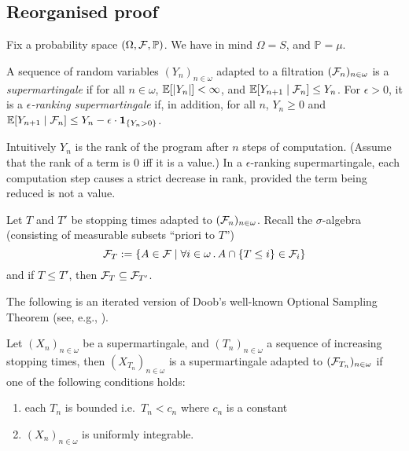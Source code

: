 \subsection*{Reorganised proof}

Fix a probability space $(\Omega, \mathcal{F}, \mathbb{P})$. 
We have in mind $\Omega = S$, and $\mathbb{P} = \mu$.

\begin{definition}\rm
A sequence of random variables $(Y_n)_{n \in \omega}$ adapted to a filtration $(\mathcal{F}_n)_{n \in \omega}$ is a \emph{supermartingale} if for all $n \in \omega$, $\mathbb{E}[|Y_n|] < \infty$, and $\mathbb{E}[Y_{n+1} \mid \mathcal{F}_n] \leq Y_n$.
For $\epsilon > 0$, it is a \emph{$\epsilon$-ranking supermartingale} if, in addition, for all $n$, $Y_n \geq 0$ and $\mathbb{E}[Y_{n+1} \mid \mathcal{F}_n] \leq Y_n - \epsilon \cdot \mathbf{1}_{\{Y_n > 0\}}$.
\citep{DBLP:conf/popl/FioritiH15,DBLP:conf/popl/ChatterjeeFNH16}
\end{definition}

Intuitively $Y_n$ is the rank of the program after $n$ steps of computation.
(Assume that the rank of a term is 0 iff it is a value.) In a $\epsilon$-ranking supermartingale, each computation step causes a strict decrease in rank, provided the term being reduced is not a value.

Let $T$ and $T'$ be stopping times adapted to $(\mathcal{F}_n)_{n \in \omega}$.
Recall the $\sigma$-algebra (consisting of measurable subsets ``priori to $T$'')
\[
\mathcal{F}_T := \{A \in \mathcal{F} \mid \forall i \in \omega \, . \, A \cap \{T \leq i\} \in \mathcal{F}_i\}
\]
and if $T \leq T'$, then $\mathcal{F}_{T} \subseteq \mathcal{F}_{T'}$.

The following is an iterated version of Doob's well-known Optional Sampling Theorem (see, e.g., \cite[\S 6.7]{AshDD00}).
\begin{theorem}
\label{thm:optional sampling}
Let $(X_n)_{n\in \omega}$ be a supermartingale, and $(T_n)_{n \in \omega}$ a sequence of increasing stopping times, then $(X_{T_n})_{n \in \omega}$ is a supermartingale adapted to $(\mathcal{F}_{T_n})_{n \in \omega}$ if one of the following conditions holds:
\begin{enumerate}
\item each $T_n$ is bounded i.e.~$T_n < c_n$ where $c_n$ is a constant
\item $(X_n)_{n\in \omega}$ is uniformly integrable.
\end{enumerate}
\end{theorem}

